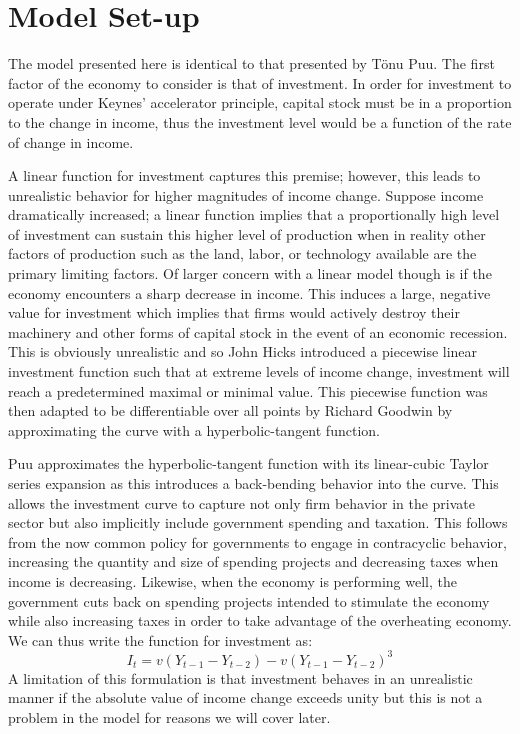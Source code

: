 \section{Model Set-up}
The model presented here is identical to that presented by T\"onu Puu\autocite{Puu2003}. The first factor of the economy to consider is that of investment. In order for investment to operate under Keynes' accelerator principle, capital stock must be in a proportion to the change in income, thus the investment level would be a function of the rate of change in income. 

A linear function for investment captures this premise; however, this leads to unrealistic behavior for higher magnitudes of income change. Suppose income dramatically increased; a linear function implies that a proportionally high level of investment can sustain this higher level of production when in reality other factors of production such as the land, labor, or technology available are the primary limiting factors. Of larger concern with a linear model though is if the economy encounters a sharp decrease in income. This induces a large, negative value for investment which implies that firms would actively destroy their machinery and other forms of capital stock in the event of an economic recession. This is obviously unrealistic and so John Hicks introduced a piecewise linear investment function such that at extreme levels of income change, investment will reach a predetermined maximal or minimal value. This piecewise function was then adapted to be differentiable over all points by Richard Goodwin by approximating the curve with a hyperbolic-tangent function\autocite{Puu2003}.

Puu approximates the hyperbolic-tangent function with its linear-cubic Taylor series expansion as this introduces a back-bending behavior into the curve. This allows the investment curve to capture not only firm behavior in the private sector but also implicitly include government spending and taxation. This follows from the now common policy for governments to engage in contracyclic behavior, increasing the quantity and size of spending projects and decreasing taxes when income is decreasing. Likewise, when the economy is performing well, the government cuts back on spending projects intended to stimulate the economy while also increasing taxes in order to take advantage of the overheating economy. We can thus write the function for investment as:
\begin{equation}
    I_t = v(Y_{t-1}-Y_{t-2})-v(Y_{t-1}-Y_{t-2})^3
\end{equation}
A limitation of this formulation is that investment behaves in an unrealistic manner if the absolute value of income change exceeds unity but this is not a problem in the model for reasons we will cover later.

